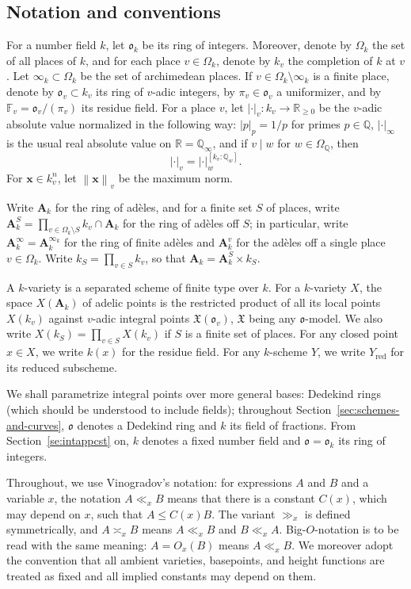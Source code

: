 \documentclass[a4paper, twoside, 11pt]{amsart}
\theoremstyle{definition}
\newcommand{\bx}{{\boldsymbol{x}}}
\newcommand{\RA}{{\mathbf{A}}}
\newcommand{\mX}{\mathfrak{X}}
\newcommand{\fo}{\mathfrak{o}}
\newcommand{\FF}{\mathbb{F}}
\newcommand{\QQ}{\mathbb{Q}}
\newcommand{\RR}{\mathbb{R}}
\newcommand{\norm}[1]{\left\lVert#1\right\rVert}
\newcommand{\red}{\mathrm{red}}
\begin{document}
\subsection{Notation and conventions}
For a number field $k$, let $\fo_k$ be its ring of integers. Moreover, denote by $\Omega_k$ the set of all places of $k$, and for each place $v\in \Omega_k$, denote by $k_v$ the completion of $k$ at $v$. Let $\infty_k\subset \Omega_k$ be the set of archimedean places. If $v\in \Omega_k\setminus \infty_k$ is a finite place, denote by $\fo_v\subset k_v$ its ring of $v$-adic integers, by $\pi_v\in \fo_v$ a uniformizer, and by $\FF_v = \fo_v/(\pi_v)$ its residue field. For a place $v$, let $|\cdot|_v\colon k_v\to \RR_{\ge 0}$ be the $v$-adic absolute value normalized in the following way: $|p|_p = 1/p$ for primes $p\in \QQ$, $|\cdot|_\infty$ is the usual real absolute value on $\RR= \QQ_\infty$, and if $v\mid w$ for $w\in \Omega_\QQ$, then
\begin{equation*}
	|\cdot|_v = |\cdot|_w^{[k_v:\QQ_w]}.
\end{equation*}
For $\bx\in k_v^n$, let $\norm{\bx}_v$ be the maximum norm.

Write $\RA_k$ for the ring of adèles, and for a finite set $S$ of places, write $\RA^{S}_k = \prod_{v\in \Omega_k\setminus S}k_v \cap \RA_k$ for the ring of adèles off $S$; in particular, write $\RA^\infty_k = \RA^{\infty_k}_k$ for the ring of finite adèles and $\RA^{v}_k$ for the adèles off a single place $v\in \Omega_k$.
Write $k_S = \prod_{v\in S} k_v$, so that $\RA_k=\RA_k^S \times k_S$.

A $k$-variety is a separated scheme of finite type over $k$. For a $k$-variety $X$, the space $X(\RA_k)$ of adelic points is the restricted product of all its local points $X(k_v)$ against $v$-adic integral points $\mX(\fo_v)$, $\mX$ being any $\fo$-model. We also write $X(k_S)=\prod_{v\in S} X(k_v)$ if $S$ is a finite set of places. For any closed point $x\in X$, we write $k(x)$ for the residue field.
For any $k$-scheme $Y$, we write $Y_\red$ for its reduced subscheme.

We shall parametrize integral points over more general bases: Dedekind rings (which should be understood to include fields); throughout Section~\ref{sec:schemes-and-curves}, $\fo$ denotes a Dedekind ring and $k$ its field of fractions. From Section~\ref{se:intappcst} on, $k$ denotes a fixed number field and $\fo=\fo_k$ its ring of integers.

Throughout, we use Vinogradov's notation: for expressions $A$ and $B$ and a variable $x$, the notation $A \ll_x B$ means that there is a constant $C(x)$, which may depend on $x$, such that $A\le C(x)B$. The variant $\gg_x$ is defined symmetrically, and $A\asymp_x B$ means $A\ll_x B$ and $B\ll_x A$. Big-$O$-notation is to be read with the same meaning: $A=O_x(B)$ means $A\ll_x B$. 
We moreover adopt the convention that all ambient varieties, basepoints, and height functions are treated as fixed and all implied constants may depend on them.
\end{document}
